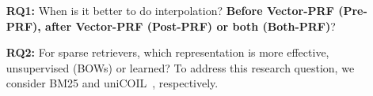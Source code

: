 


%

\begin{enumerate}[leftmargin=25pt]
	\item[\textbf{RQ1:}] When is it better to do interpolation? \textbf{Before Vector-PRF (Pre-PRF), after Vector-PRF (Post-PRF) or both (Both-PRF)}?
	\item[\textbf{RQ2:}] For sparse retrievers, which representation is more effective, unsupervised (BOWs) or learned? To address this research question, we consider BM25 and uniCOIL~\cite{lin2021few}, respectively.
	
	
\end{enumerate}

